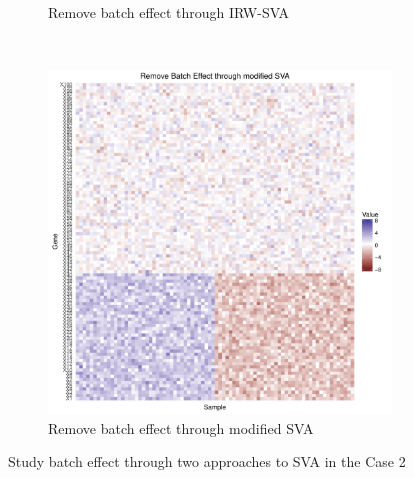 \documentclass[11pt]{article}
\begin{document}
\begin{figure}[h!]
\begin{subfigure}[b]{0.3\textwidth}
        \caption{Remove batch effect through IRW-SVA}
    \end{subfigure}  %
~
    \begin{subfigure}[b]{0.3\textwidth}
        \centering
        \includegraphics[width = \textwidth]{figures/new_sva0.pdf}
        \caption{Remove batch effect through modified SVA}
    \end{subfigure}    
    \caption{Study batch effect through two approaches to SVA in the Case 2}
    \label{fig:sva2}
\end{figure}
\end{document}
